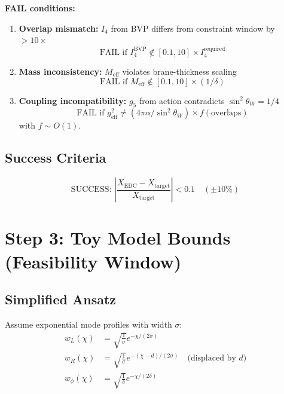 \documentclass[11pt]{article}
\begin{document}
\begin{tcolorbox}[colback=red!5!white, colframe=red!75!black, title=Falsification Criteria (P3-3)]
\textbf{FAIL conditions:}
\begin{enumerate}
    \item \textbf{Overlap mismatch:} $I_4$ from BVP differs from constraint window by $>10\times$
    \begin{equation}
        \text{FAIL if } I_4^{\text{BVP}} \notin [0.1, 10] \times I_4^{\text{required}}
    \end{equation}

    \item \textbf{Mass inconsistency:} $M_{\text{eff}}$ violates brane-thickness scaling
    \begin{equation}
        \text{FAIL if } M_{\text{eff}} \notin [0.1, 10] \times (1/\delta)
    \end{equation}

    \item \textbf{Coupling incompatibility:} $g_5$ from action contradicts $\sin^2\theta_W = 1/4$
    \begin{equation}
        \text{FAIL if } g_{\text{eff}}^2 \neq (4\pi\alpha/\sin^2\theta_W) \times f(\text{overlaps})
    \end{equation}
    with $f \sim O(1)$.
\end{enumerate}
\end{tcolorbox}

\subsection{Success Criteria}

\begin{equation}
    \text{SUCCESS: } \left| \frac{X_{\text{EDC}} - X_{\text{target}}}{X_{\text{target}}} \right| < 0.1 \quad (\pm 10\%)
\end{equation}

\section{Step 3: Toy Model Bounds (Feasibility Window)}

\subsection{Simplified Ansatz}

Assume exponential mode profiles with width $\sigma$:
\begin{align}
    w_L(\chi) &= \sqrt{\frac{1}{\sigma}} e^{-\chi/(2\sigma)} \\
    w_R(\chi) &= \sqrt{\frac{1}{\sigma}} e^{-(\chi - d)/(2\sigma)} \quad \text{(displaced by } d\text{)} \\
    w_\phi(\chi) &= \sqrt{\frac{1}{\delta}} e^{-\chi/(2\delta)}
\end{align}
\end{document}
